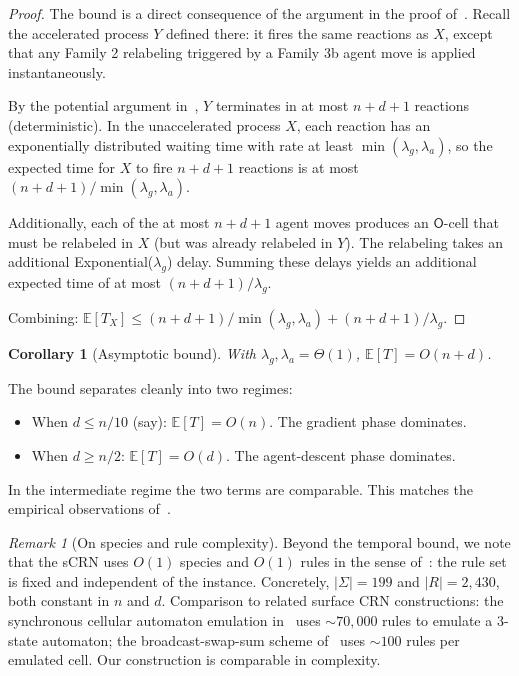 \documentclass[11pt]{article}
\theoremstyle{plain}
\newtheorem{corollary}[theorem]{Corollary}
\theoremstyle{definition}
\theoremstyle{remark}
\newtheorem{remark}[theorem]{Remark}
\begin{document}
\begin{proof}
The bound is a direct consequence of the argument in the proof of~. Recall the accelerated process $Y$ defined there: it fires the same reactions as $X$, except that any Family 2 relabeling triggered by a Family 3b agent move is applied instantaneously.

By the potential argument in~, $Y$ terminates in at most $n + d + 1$ reactions (deterministic). In the unaccelerated process $X$, each reaction has an exponentially distributed waiting time with rate at least $\min(\lambda_g, \lambda_a)$, so the expected time for $X$ to fire $n + d + 1$ reactions is at most $(n + d + 1) / \min(\lambda_g, \lambda_a)$.

Additionally, each of the at most $n + d + 1$ agent moves produces an $\mathsf{O}$-cell that must be relabeled in $X$ (but was already relabeled in $Y$). The relabeling takes an additional Exponential($\lambda_g$) delay. Summing these delays yields an additional expected time of at most $(n + d + 1) / \lambda_g$.

Combining: $\mathbb{E}[T_X] \leq (n + d + 1)/\min(\lambda_g, \lambda_a) + (n + d + 1)/\lambda_g$.
\end{proof}

\begin{corollary}[Asymptotic bound]
\label{cor:upper-asymptotic}
With $\lambda_g, \lambda_a = \Theta(1)$, $\mathbb{E}[T] = O(n + d)$.
\end{corollary}

The bound separates cleanly into two regimes:
\begin{itemize}
    \item When $d \leq n / 10$ (say): $\mathbb{E}[T] = O(n)$. The gradient phase dominates.
    \item When $d \geq n / 2$: $\mathbb{E}[T] = O(d)$. The agent-descent phase dominates.
\end{itemize}
In the intermediate regime the two terms are comparable. This matches the empirical observations of~.

\begin{remark}[On species and rule complexity]
\label{rem:complexity}
Beyond the temporal bound, we note that the sCRN uses $O(1)$ species and $O(1)$ rules in the sense of~: the rule set is fixed and independent of the instance. Concretely, $|\Sigma| = 199$ and $|R| = 2{,}430$, both constant in $n$ and $d$. Comparison to related surface CRN constructions: the synchronous cellular automaton emulation in~\cite[\S 3.2]{clamons2020} uses $\sim 70{,}000$ rules to emulate a $3$-state automaton; the broadcast-swap-sum scheme of~\cite[\S 3.3]{clamons2020} uses $\sim 100$ rules per emulated cell. Our construction is comparable in complexity.
\end{remark}
\end{document}

